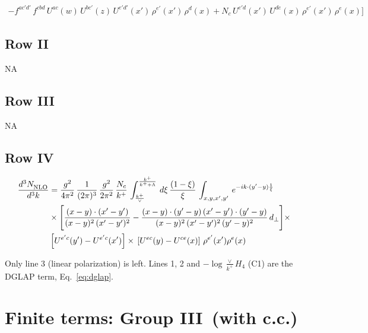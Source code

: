 \documentclass[9pt]{article}
\newcommand{\new}[1]{{\color{blue}#1}}
\numberwithin{equation}{section}
\begin{document}
\begin{align}
-f^{ac'd'}\,f^{cbd}\,U^{ac}(w)\,U^{bc'}(z)\,U^{e'd'}(x')\,\rho^{e'}(x')\,\rho^{d}(x) +N_{c}\,U^{e'd}(x')\,U^{de}(x)\,\rho^{e'}(x')\,\rho^{e}(x)\Bigg]
\end{align}
\subsection{Row II}
\textsc{NA}
\subsection{Row III}
\textsc{NA}
\subsection{Row IV}
\begin{align}
    \frac{d^{3}N_{\rm NLO}^{\rm}}{d^{3}k}  & = \frac{g^{2}}{4\pi^{2}}\, \frac{1}{(2\pi)^{3}}\,\frac{g^{2}}{2\pi^{2}}\, \frac{N_{c}}{k^{+}}\,\int_{\frac{k^{+}}{\vee}}^{\frac{k^{+}}{k^{+}+\Lambda}}\,d\xi\, \frac{(1-\xi)}{\xi}\, \int_{x,y,x',y'}\,e^{-ik\cdot (y'-y)\frac{1}{\xi}}\notag \\ & \times\Bigg[\frac{(x-y)\cdot (x'-y')}{(x-y)^{2}\, (x'-y')^{2}} -\frac{(x-y)\cdot (y'-y)\, (x'-y')\cdot (y'-y)}{(x-y)^{2}\,(x'-y')^{2}\,(y'-y)^{2}}\,d_{\perp}\Bigg]\times\notag \\ &  \left[U^{e'c}(y') - U^{e'c}(x')\right] \times\, \left[U^{ec}(y) - U^{ce}(x)\right]\, \rho^{e'}(x') \rho^{e}(x)
\end{align}

\new{Only line 3 (linear polarization) is left. Lines 1, 2 and $-\log\frac{\vee}{k^+}H_4$ (C1) are the DGLAP term, Eq.~\eqref{eq:dglap}.}
\section{Finite terms: Group III\, (with c.c.)}
\end{document}
